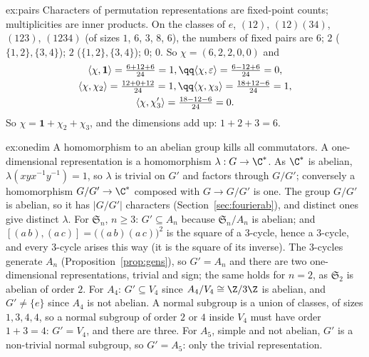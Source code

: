 \begin{solution}{ex:pairs}
\idea Characters of permutation representations are fixed-point counts; multiplicities are inner products.
\writeup On the classes of $e$, $(12)$, $(12)(34)$, $(123)$, $(1234)$ (of sizes $1$, $6$, $3$, $8$, $6$), the numbers of fixed pairs are $6$; $2$ ($\{1,2\},\{3,4\}$); $2$ ($\{1,2\},\{3,4\}$); $0$; $0$. So $\chi=(6,2,2,0,0)$ and
\[
\begin{gathered}
\langle\chi,\mathbf1\rangle=\tfrac{6+12+6}{24}=1,\qq\langle\chi,\varepsilon\rangle=\tfrac{6-12+6}{24}=0,\\
\langle\chi,\chi_2\rangle=\tfrac{12+0+12}{24}=1,\qq\langle\chi,\chi_3\rangle=\tfrac{18+12-6}{24}=1,\\
\langle\chi,\chi_3'\rangle=\tfrac{18-12-6}{24}=0.
\end{gathered}
\]
So $\chi=\mathbf1+\chi_2+\chi_3$, and the dimensions add up: $1+2+3=6$.
\end{solution}

\begin{solution}{ex:onedim}
\idea A homomorphism to an abelian group kills all commutators.
\writeup A one-dimensional representation is a homomorphism $\lambda:G\to\C^*$. As $\C^*$ is abelian, $\lambda(xyx^{-1}y^{-1})=1$, so $\lambda$ is trivial on $G'$ and factors through $G/G'$; conversely a homomorphism $G/G'\to\C^*$ composed with $G\to G/G'$ is one. The group $G/G'$ is abelian, so it has $|G/G'|$ characters (Section~\ref{sec:fourierab}), and distinct ones give distinct $\lambda$. For $\mathfrak S_n$, $n\ge3$: $G'\subseteq A_n$ because $\mathfrak S_n/A_n$ is abelian; and $[(a\,b),(a\,c)]=\bigl((a\,b)(a\,c)\bigr)^2$ is the square of a $3$-cycle, hence a $3$-cycle, and every $3$-cycle arises this way (it is the square of its inverse). The $3$-cycles generate $A_n$ (Proposition~\ref{prop:gens}), so $G'=A_n$ and there are two one-dimensional representations, trivial and sign; the same holds for $n=2$, as $\mathfrak S_2$ is abelian of order $2$. For $A_4$: $G'\subseteq V_4$ since $A_4/V_4\cong\Z/3\Z$ is abelian, and $G'\ne\{e\}$ since $A_4$ is not abelian. A normal subgroup is a union of classes, of sizes $1,3,4,4$, so a normal subgroup of order $2$ or $4$ inside $V_4$ must have order $1+3=4$: $G'=V_4$, and there are three. For $A_5$, simple and not abelian, $G'$ is a non-trivial normal subgroup, so $G'=A_5$: only the trivial representation.
\end{solution}


